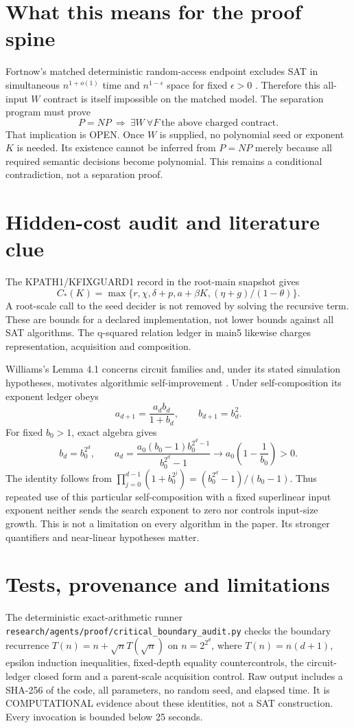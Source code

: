 \documentclass[11pt]{article}
\begin{document}
\section{What this means for the proof spine}
Fortnow's matched deterministic random-access endpoint excludes SAT in
simultaneous $n^{1+o(1)}$ time and $n^{1-\epsilon}$ space for fixed
$\epsilon>0$ \cite{fortnow}. Therefore this all-input $W$ contract is
itself impossible on the matched model. The separation program must prove
\[
 P=NP\ \Longrightarrow\ \exists W\ \forall F\ \text{the above charged contract}.
\]
That implication is OPEN. Once $W$ is supplied, no polynomial seed or
exponent $K$ is needed. Its existence cannot be inferred from $P=NP$
merely because all required semantic decisions become polynomial.
This remains a conditional contradiction, not a separation proof.

\section{Hidden-cost audit and literature clue}
The KPATH1/KFIXGUARD1 record in the root-main snapshot gives
\[
C_*(K)=\max\{r,\chi,\delta+p,a+\beta K,(\eta+g)/(1-\theta)\}.
\]
A root-scale call to the seed decider is not removed by solving the
recursive term. These are bounds for a declared implementation, not
lower bounds against all SAT algorithms. The q-squared relation ledger
in main5 likewise charges representation, acquisition and composition.

Williams's Lemma 4.1 concerns circuit families and, under its stated
simulation hypotheses, motivates algorithmic self-improvement
\cite{williams}. Under self-composition its exponent ledger obeys
\[
a_{d+1}=\frac{a_db_d}{1+b_d},\qquad b_{d+1}=b_d^2.
\]
For fixed $b_0>1$, exact algebra gives
\[
b_d=b_0^{2^d},\qquad
a_d=\frac{a_0(b_0-1)b_0^{2^d-1}}{b_0^{2^d}-1}
\longrightarrow a_0\left(1-\frac1{b_0}\right)>0.
\]
The identity follows from
$\prod_{j=0}^{d-1}(1+b_0^{2^j})=(b_0^{2^d}-1)/(b_0-1)$.
Thus repeated use of this particular self-composition with a fixed
superlinear input exponent neither sends the search exponent to zero nor
controls input-size growth. This is not a limitation on every algorithm
in the paper. Its stronger quantifiers and near-linear hypotheses matter.

\section{Tests, provenance and limitations}
The deterministic exact-arithmetic runner
\texttt{research/agents/proof/critical\_boundary\_audit.py} checks the
boundary recurrence $T(n)=n+\sqrt n T(\sqrt n)$ on
$n=2^{2^d}$, where $T(n)=n(d+1)$, epsilon induction inequalities,
fixed-depth equality countercontrols, the circuit-ledger closed form and
a parent-scale acquisition control. Raw output includes a SHA-256 of the
code, all parameters, no random seed, and elapsed time. It is COMPUTATIONAL
evidence about these identities, not a SAT construction. Every invocation
is bounded below 25 seconds.
\end{document}
